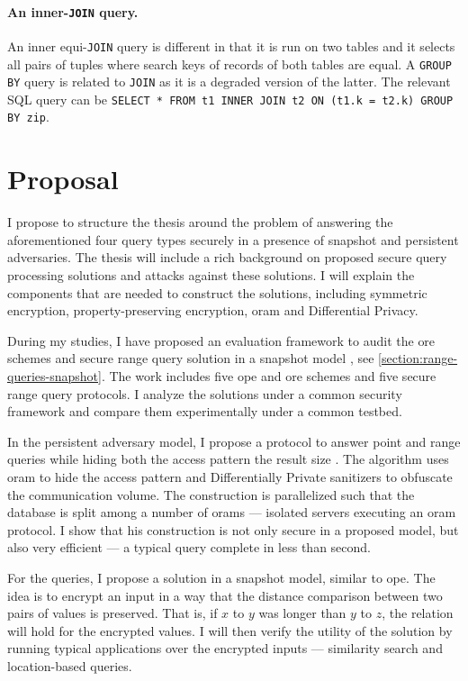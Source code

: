 		\paragraph*{An inner-\texttt{JOIN} query.}
			An inner equi-\texttt{JOIN} query is different in that it is run on two tables and it selects all pairs of tuples where search keys of records of both tables are equal.
			A \texttt{GROUP BY} query is related to \texttt{JOIN} as it is a degraded version of the latter.
			The relevant SQL query can be \texttt{SELECT * FROM t1 INNER JOIN t2 ON (t1.k = t2.k) GROUP BY zip}.

	\section{Proposal}

		I propose to structure the thesis around the problem of answering the aforementioned four query types securely in a presence of snapshot and persistent adversaries.
		The thesis will include a rich background on proposed secure query processing solutions and attacks against these solutions.
		I will explain the components that are needed to construct the solutions, including symmetric encryption, property-preserving encryption, \Gls{oram} and Differential Privacy.

		During my studies, I have proposed an evaluation framework to audit the \gls{ore} schemes and secure range query solution in a snapshot model \cite{ore-benchmark-17}, see \cref{section:range-queries-snapshot}.
		The work includes five \gls{ope} and \gls{ore} schemes and five secure range query protocols.
		I analyze the solutions under a common security framework and compare them experimentally under a common testbed.

		In the persistent adversary model, I propose a protocol to answer point and range queries while hiding both the access pattern the result size \cite{epsolute}.
		The algorithm uses \Gls{oram} to hide the access pattern and Differentially Private sanitizers to obfuscate the communication volume.
		The construction is parallelized such that the database is split among a number of \Glspl{oram} --- isolated servers executing an \Gls{oram} protocol.
		I show that his construction is not only secure in a proposed model, but also very efficient --- a typical query complete in less than second.

		For the \knn{} queries, I propose a solution in a snapshot model, similar to \gls{ope}.
		The idea is to encrypt an input in a way that the distance comparison between two pairs of values is preserved.
		That is, if $x$ to $y$ was longer than $y$ to $z$, the relation will hold for the encrypted values.
		I will then verify the utility of the solution by running typical \knn{} applications over the encrypted inputs --- similarity search and location-based queries.

